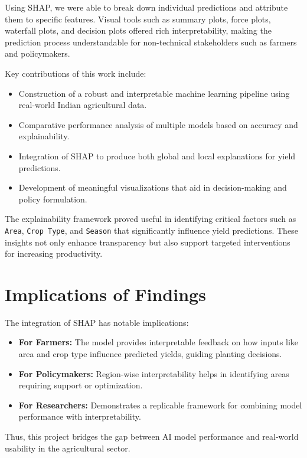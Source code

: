 \documentclass[a4paper,11pt,oneside]{book}
\begin{document}
Using SHAP, we were able to break down individual predictions and attribute them to specific features. Visual tools such as summary plots, force plots, waterfall plots, and decision plots offered rich interpretability, making the prediction process understandable for non-technical stakeholders such as farmers and policymakers.

Key contributions of this work include:
\begin{itemize}
    \item Construction of a robust and interpretable machine learning pipeline using real-world Indian agricultural data.
    \item Comparative performance analysis of multiple models based on accuracy and explainability.
    \item Integration of SHAP to produce both global and local explanations for yield predictions.
    \item Development of meaningful visualizations that aid in decision-making and policy formulation.
\end{itemize}

The explainability framework proved useful in identifying critical factors such as \texttt{Area}, \texttt{Crop Type}, and \texttt{Season} that significantly influence yield predictions. These insights not only enhance transparency but also support targeted interventions for increasing productivity.

\section{Implications of Findings}

The integration of SHAP has notable implications:

\begin{itemize}
    \item \textbf{For Farmers:} The model provides interpretable feedback on how inputs like area and crop type influence predicted yields, guiding planting decisions.
    \item \textbf{For Policymakers:} Region-wise interpretability helps in identifying areas requiring support or optimization.
    \item \textbf{For Researchers:} Demonstrates a replicable framework for combining model performance with interpretability.
\end{itemize}

Thus, this project bridges the gap between AI model performance and real-world usability in the agricultural sector.
\end{document}
